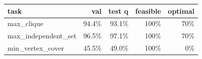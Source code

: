 \begin{tabular}{lrrrr}
\toprule
task & val & test q & feasible & optimal \\
\midrule
max\_clique & 94.4\% & 93.1\% & 100\% & 70\% \\
max\_independent\_set & 96.5\% & 97.1\% & 100\% & 70\% \\
min\_vertex\_cover & 45.5\% & 49.0\% & 100\% & 0\% \\
\bottomrule
\end{tabular}
